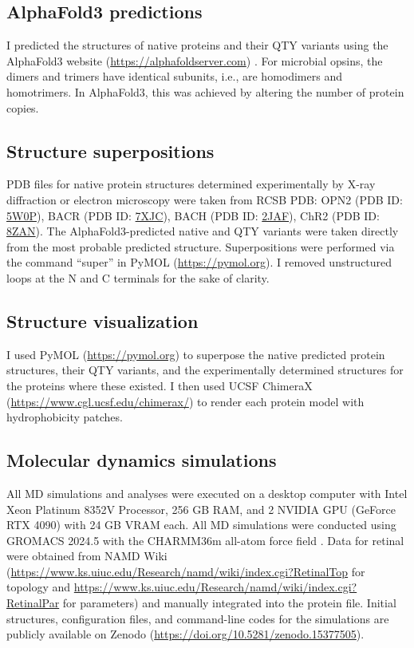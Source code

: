 \documentclass[fleqn, 10pt]{manuscript}
\begin{document}
\subsection*{AlphaFold3 predictions}

I predicted the structures of native proteins and their QTY variants using the AlphaFold3 website (\url{https://alphafoldserver.com}) \citep{Abramson_2024}. For microbial opsins, the dimers and trimers have identical subunits, i.e., are homodimers and homotrimers. In AlphaFold3, this was achieved by altering the number of protein copies. 

\subsection*{Structure superpositions}

PDB files for native protein structures determined experimentally by X-ray diffraction or electron microscopy were taken from RCSB PDB: OPN2 (PDB ID: \href{https://www.rcsb.org/structure/5W0P}{5W0P}), BACR (PDB ID: \href{https://www.rcsb.org/structure/7XJC}{7XJC}), BACH (PDB ID: \href{https://www.rcsb.org/structure/2JAF}{2JAF}), ChR2 (PDB ID: \href{https://www.rcsb.org/structure/8ZAN}{8ZAN}). The AlphaFold3-predicted native and QTY variants were taken directly from the most probable predicted structure. Superpositions were performed via the command ``super'' in PyMOL (\url{https://pymol.org}). I removed unstructured loops at the N and C terminals for the sake of clarity. 

\subsection*{Structure visualization}

I used PyMOL (\url{https://pymol.org}) to superpose the native predicted protein structures, their QTY variants, and the experimentally determined structures for the proteins where these existed. I then used UCSF ChimeraX (\url{https://www.cgl.ucsf.edu/chimerax/}) to render each protein model with hydrophobicity patches.  

\subsection*{Molecular dynamics simulations}

All MD simulations and analyses were executed on a desktop computer with Intel Xeon Platinum 8352V Processor, 256 GB RAM, and 2 NVIDIA GPU (GeForce RTX 4090) with 24 GB VRAM each. All MD simulations were conducted using GROMACS 2024.5 \citep{Abraham_2015} with the CHARMM36m all-atom force field \citep{Huang_2017}. Data for retinal were obtained from NAMD Wiki (\url{https://www.ks.uiuc.edu/Research/namd/wiki/index.cgi?RetinalTop} for topology and \url{https://www.ks.uiuc.edu/Research/namd/wiki/index.cgi?RetinalPar} for parameters) and manually integrated into the protein file. Initial structures, configuration files, and command-line codes for the simulations are publicly available on Zenodo (\url{https://doi.org/10.5281/zenodo.15377505}). 
\end{document}
